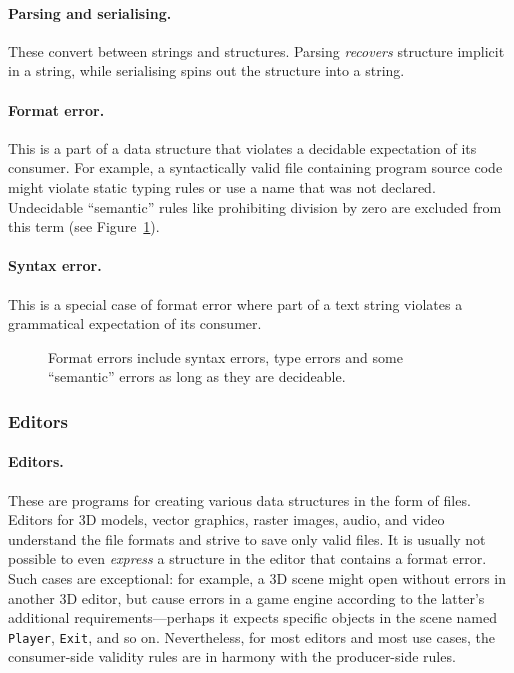 \paragraph{Parsing and serialising.}

These convert between strings and structures. Parsing \emph{recovers}
structure implicit in a string, while serialising spins out the
structure into a string.

\paragraph{Format error.}

This is a part of a data structure that violates a decidable expectation
of its consumer. For example, a syntactically valid file containing
program source code might violate static typing rules or use a name that
was not declared. Undecidable ``semantic'' rules like prohibiting
division by zero are excluded from this term (see
Figure~\ref{fig:format-errors}).

\paragraph{Syntax error.}

This is a special case of format error where part of a text string
violates a grammatical expectation of its consumer.

\begin{figure}
\centering

\caption{Format errors include syntax errors, type errors and some ``semantic'' errors as long as they are decideable.}
\label{fig:format-errors}
\end{figure}

\hypertarget{editors}{%
\subsubsection{Editors}\label{editors}}

\paragraph{Editors.}

These are programs for creating various data structures in the form of
files. Editors for 3D models, vector graphics, raster images, audio, and
video understand the file formats and strive to save only valid files.
It is usually not possible to even \emph{express} a structure in the
editor that contains a format error. Such cases are exceptional: for
example, a 3D scene might open without errors in another 3D editor, but
cause errors in a game engine according to the latter's additional
requirements---perhaps it expects specific objects in the scene named
\texttt{Player}, \texttt{Exit}, and so on. Nevertheless, for most
editors and most use cases, the consumer-side validity rules are in
harmony with the producer-side rules.

